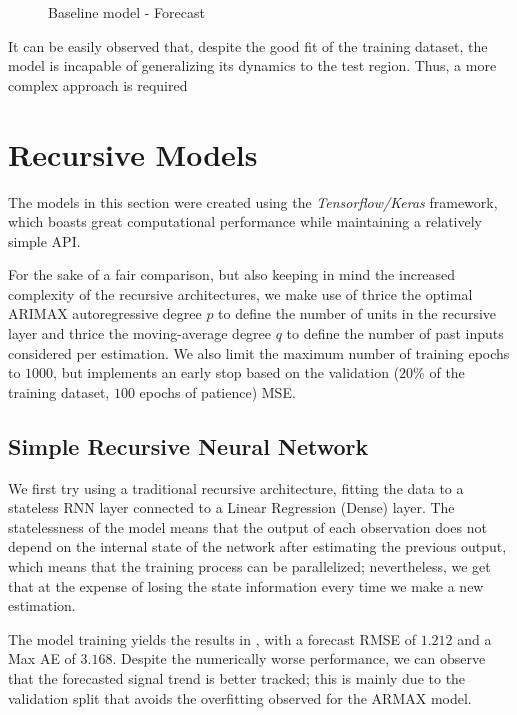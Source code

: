 \documentclass{scrartcl}
\begin{document}
  \begin{figure}[ht]
    \centering
    
    \caption{Baseline model - Forecast}
    \label{fig:baseline_fit}
  \end{figure}

  It can be easily observed that, despite the good fit of the training dataset, the model is incapable of generalizing its dynamics to the test region. Thus, a more complex approach is required

\section{Recursive Models}

  The models in this section were created using the \emph{Tensorflow/Keras} framework, which boasts great computational performance while maintaining a relatively simple API.

  For the sake of a fair comparison, but also keeping in mind the increased complexity of the recursive architectures, we make use of thrice the optimal ARIMAX autoregressive degree $p$ to define the number of units in the recursive layer and thrice the moving-average degree $q$ to define the number of past inputs considered per estimation. We also limit the maximum number of training epochs to $1000$, but implements an early stop based on the validation ($20\%$ of the training dataset, $100$ epochs of patience) MSE.

  \subsection{Simple Recursive Neural Network}

    We first try using a traditional recursive architecture, fitting the data to a stateless RNN layer connected to a Linear Regression (Dense) layer. The statelessness of the model means that the output of each observation does not depend on the internal state of the network after estimating the previous output, which means that the training process can be parallelized; nevertheless, we get that at the expense of losing the state information every time we make a new estimation. 

    The model training yields the results in , with a forecast RMSE of $1.212$ and a Max AE of $3.168$. Despite the numerically worse performance, we can observe that the forecasted signal trend is better tracked; this is mainly due to the validation split that avoids the overfitting observed for the ARMAX model.
\end{document}
